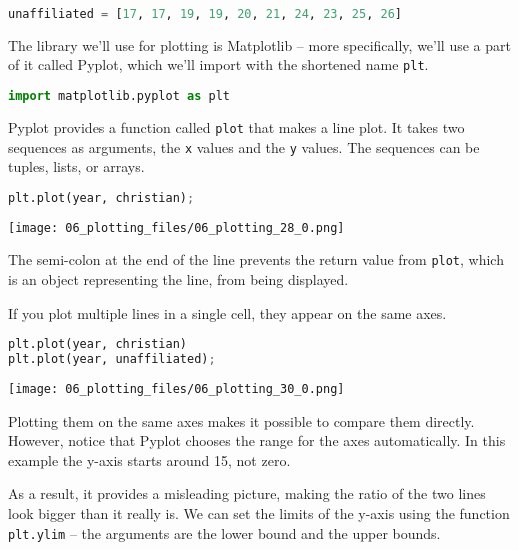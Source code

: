 \begin{lstlisting}[language=Python,style=source]
unaffiliated = [17, 17, 19, 19, 20, 21, 24, 23, 25, 26]
\end{lstlisting}

The library we'll use for plotting is Matplotlib -- more specifically,
we'll use a part of it called Pyplot, which we'll import with the
shortened name \passthrough{\lstinline!plt!}.

\begin{lstlisting}[language=Python,style=source]
import matplotlib.pyplot as plt
\end{lstlisting}

Pyplot provides a function called \passthrough{\lstinline!plot!} that
makes a line plot. It takes two sequences as arguments, the
\passthrough{\lstinline!x!} values and the \passthrough{\lstinline!y!}
values. The sequences can be tuples, lists, or arrays.

\begin{lstlisting}[language=Python,style=source]
plt.plot(year, christian);
\end{lstlisting}

\begin{center}
\texttt{[image: 06\_plotting\_files/06\_plotting\_28\_0.png]}
\end{center}

The semi-colon at the end of the line prevents the return value from
\passthrough{\lstinline!plot!}, which is an object representing the
line, from being displayed.

If you plot multiple lines in a single cell, they appear on the same
axes.

\begin{lstlisting}[language=Python,style=source]
plt.plot(year, christian)
plt.plot(year, unaffiliated);
\end{lstlisting}

\begin{center}
\texttt{[image: 06\_plotting\_files/06\_plotting\_30\_0.png]}
\end{center}

Plotting them on the same axes makes it possible to compare them
directly. However, notice that Pyplot chooses the range for the axes
automatically. In this example the y-axis starts around 15, not zero.

As a result, it provides a misleading picture, making the ratio of the
two lines look bigger than it really is. We can set the limits of the
y-axis using the function \passthrough{\lstinline!plt.ylim!} -- the
arguments are the lower bound and the upper bounds.

